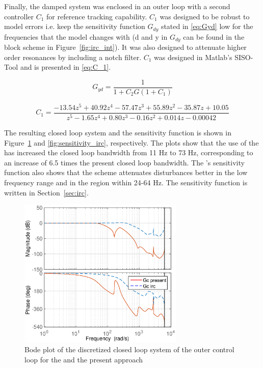 \FloatBarrier
Finally, the damped system was enclosed in an outer loop with a second controller $C_1$ for reference tracking capability. $C_1$ was designed to be robust to model errors i.e. keep the sensitivity function $G_{dy}$ stated in \eqref{eq:Gyd} low for the frequencies that the model changes with (d and y in $G_{dy}$ can be found in the block scheme in Figure~\ref{fig:irc_int}). It was also designed to attenuate higher order resonances by including a notch filter.  $C_1$ was designed in Matlab's SISO-Tool and is presented in \eqref{eq:C_1}.

\begin{equation}
  \label{eq:Gyd}
  G_{yd} = \frac{1}{1 + C_2G(1 + C_1)}
\end{equation}

\begin{equation}
  \label{eq:C_1}
  C_1 = \frac{-13.54 z^5 + 40.92 z^4 - 57.47 z^3 + 55.89 z^2 - 35.87 z + 10.05}{z^5 - 1.65 z^4 + 0.80 z^3 - 0.16 z^2 + 0.014 z - 0.00042}
\end{equation}

The resulting closed loop system and the sensitivity function is shown in Figure~\ref{fig:irc_totalclosed} and \ref{fig:sensitivity_irc}, respectively. The plots show that the use of the \abbrIRC has increased the closed loop bandwidth from 11 Hz to 73 Hz, corresponding to an increase of 6.5 times the present closed loop bandwidth. The \abbrIRC's sensitivity function also shows that the \abbrIRC scheme attenuates disturbances better in the low frequency range and in the region within 24-64 Hz. The sensitivity function is written in Section~\ref{sec:irc}.

\begin{figure}[h!]
  \centering
  \includegraphics[width=0.7\textwidth]{fig/matlab/totalclosedloop.eps}
  \caption{\label{fig:irc_totalclosed} Bode plot of the discretized closed loop system of the outer control loop for the \abbrIRC and the present approach}
\end{figure}

